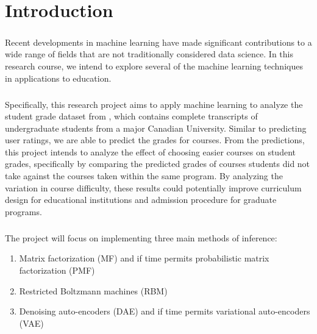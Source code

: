 
\chapter{Introduction} \label{sc:intro}

\paragraph{}
Recent developments in machine learning have made significant 
contributions to a wide range of fields that are not 
traditionally considered data science.
In this research course, we intend to explore several of the 
machine learning techniques in applications to education.

\paragraph{}
Specifically, this research project aims to apply machine learning 
to analyze the student grade dataset from \cite{BaRoYo14},
which contains complete transcripts of undergraduate students
from a major Canadian University.
Similar to predicting user ratings,
we are able to predict the grades for courses.
From the predictions, this project intends to analyze
the effect of choosing easier courses on student grades,
specifically by comparing the predicted grades of courses
students did not take against the courses taken 
within the same program.
By analyzing the variation in course difficulty,
these results could potentially improve curriculum design 
for educational institutions and admission procedure for
graduate programs.

\paragraph{}
The project will focus on implementing three main methods of inference:
\vspace{-0em}
\begin{enumerate}
\setlength\itemsep{-0.2em}
  \item Matrix factorization (MF) \cite{FeHeKh12} and if time permits
  	probabilistic matrix factorization (PMF) \cite{MnSa07, SaMn08}
  \item Restricted Boltzmann machines (RBM) \cite{Sa09}
  \item Denoising auto-encoders (DAE) \cite{VLLBM10} and if time permits
  	variational auto-encoders (VAE) \cite{KiWe13}
\end{enumerate}


